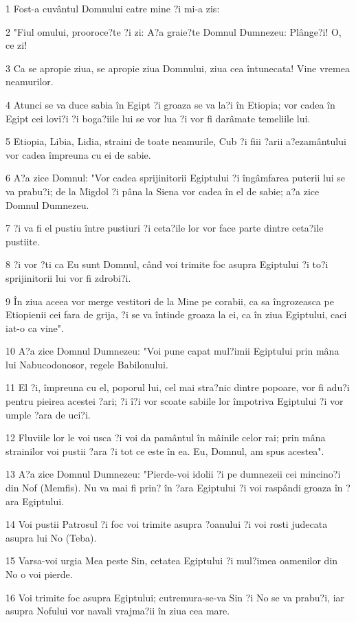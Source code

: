 \par 1 Fost-a cuvântul Domnului catre mine ?i mi-a zis:
\par 2 "Fiul omului, prooroce?te ?i zi: A?a graie?te Domnul Dumnezeu: Plânge?i! O, ce zi!
\par 3 Ca se apropie ziua, se apropie ziua Domnului, ziua cea întunecata! Vine vremea neamurilor.
\par 4 Atunci se va duce sabia în Egipt ?i groaza se va la?i în Etiopia; vor cadea în Egipt cei lovi?i ?i boga?iile lui se vor lua ?i vor fi darâmate temeliile lui.
\par 5 Etiopia, Libia, Lidia, straini de toate neamurile, Cub ?i fiii ?arii a?ezamântului vor cadea împreuna cu ei de sabie.
\par 6 A?a zice Domnul: "Vor cadea sprijinitorii Egiptului ?i îngâmfarea puterii lui se va prabu?i; de la Migdol ?i pâna la Siena vor cadea în el de sabie; a?a zice Domnul Dumnezeu.
\par 7 ?i va fi el pustiu între pustiuri ?i ceta?ile lor vor face parte dintre ceta?ile pustiite.
\par 8 ?i vor ?ti ca Eu sunt Domnul, când voi trimite foc asupra Egiptului ?i to?i sprijinitorii lui vor fi zdrobi?i.
\par 9 În ziua aceea vor merge vestitori de la Mine pe corabii, ca sa îngrozeasca pe Etiopienii cei fara de grija, ?i se va întinde groaza la ei, ca în ziua Egiptului, caci iat-o ca vine".
\par 10 A?a zice Domnul Dumnezeu: "Voi pune capat mul?imii Egiptului prin mâna lui Nabucodonosor, regele Babilonului.
\par 11 El ?i, împreuna cu el, poporul lui, cel mai stra?nic dintre popoare, vor fi adu?i pentru pieirea acestei ?ari; ?i î?i vor scoate sabiile lor împotriva Egiptului ?i vor umple ?ara de uci?i.
\par 12 Fluviile lor le voi usca ?i voi da pamântul în mâinile celor rai; prin mâna strainilor voi pustii ?ara ?i tot ce este în ea. Eu, Domnul, am spus acestea".
\par 13 A?a zice Domnul Dumnezeu: "Pierde-voi idolii ?i pe dumnezeii cei mincino?i din Nof (Memfis). Nu va mai fi prin? în ?ara Egiptului ?i voi raspândi groaza în ?ara Egiptului.
\par 14 Voi pustii Patrosul ?i foc voi trimite asupra ?oanului ?i voi rosti judecata asupra lui No (Teba).
\par 15 Varsa-voi urgia Mea peste Sin, cetatea Egiptului ?i mul?imea oamenilor din No o voi pierde.
\par 16 Voi trimite foc asupra Egiptului; cutremura-se-va Sin ?i No se va prabu?i, iar asupra Nofului vor navali vrajma?ii în ziua cea mare.
